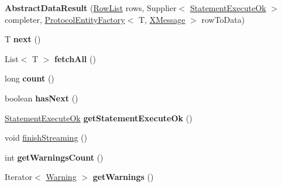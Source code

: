 \begin{DoxyCompactItemize}
\item 
\mbox{\label{classcom_1_1mysql_1_1cj_1_1xdevapi_1_1_abstract_data_result_a662bf16eb25a6e01e053580bc63f020d}} 
{\bfseries Abstract\+Data\+Result} (\mbox{\hyperlink{interfacecom_1_1mysql_1_1cj_1_1result_1_1_row_list}{Row\+List}} rows, Supplier$<$ \mbox{\hyperlink{classcom_1_1mysql_1_1cj_1_1protocol_1_1x_1_1_statement_execute_ok}{Statement\+Execute\+Ok}} $>$ completer, \mbox{\hyperlink{interfacecom_1_1mysql_1_1cj_1_1protocol_1_1_protocol_entity_factory}{Protocol\+Entity\+Factory}}$<$ T, \mbox{\hyperlink{classcom_1_1mysql_1_1cj_1_1protocol_1_1x_1_1_x_message}{X\+Message}} $>$ row\+To\+Data)
\item 
\mbox{\label{classcom_1_1mysql_1_1cj_1_1xdevapi_1_1_abstract_data_result_a275a94d6439506bd062c6c38e911283c}} 
T {\bfseries next} ()
\item 
\mbox{\label{classcom_1_1mysql_1_1cj_1_1xdevapi_1_1_abstract_data_result_aa0376cefb0ca352d431b392149481588}} 
List$<$ T $>$ {\bfseries fetch\+All} ()
\item 
\mbox{\label{classcom_1_1mysql_1_1cj_1_1xdevapi_1_1_abstract_data_result_a7825d8f19a7fd60da5c89755219a22d2}} 
long {\bfseries count} ()
\item 
\mbox{\label{classcom_1_1mysql_1_1cj_1_1xdevapi_1_1_abstract_data_result_af873fff3d2449cd6a1f189be25d58ec6}} 
boolean {\bfseries has\+Next} ()
\item 
\mbox{\label{classcom_1_1mysql_1_1cj_1_1xdevapi_1_1_abstract_data_result_ab2e2a86090761e83b3198b2581a31d69}} 
\mbox{\hyperlink{classcom_1_1mysql_1_1cj_1_1protocol_1_1x_1_1_statement_execute_ok}{Statement\+Execute\+Ok}} {\bfseries get\+Statement\+Execute\+Ok} ()
\item 
void \mbox{\hyperlink{classcom_1_1mysql_1_1cj_1_1xdevapi_1_1_abstract_data_result_a6a37bb1022bc6bea43edf1f996dca4d4}{finish\+Streaming}} ()
\item 
\mbox{\label{classcom_1_1mysql_1_1cj_1_1xdevapi_1_1_abstract_data_result_aa3c13a06303670b7e9720befa3daf72b}} 
int {\bfseries get\+Warnings\+Count} ()
\item 
\mbox{\label{classcom_1_1mysql_1_1cj_1_1xdevapi_1_1_abstract_data_result_ac75c20b55a1923cac43c52ca6df9bdca}} 
Iterator$<$ \mbox{\hyperlink{interfacecom_1_1mysql_1_1cj_1_1protocol_1_1_warning}{Warning}} $>$ {\bfseries get\+Warnings} ()
\end{DoxyCompactItemize}
